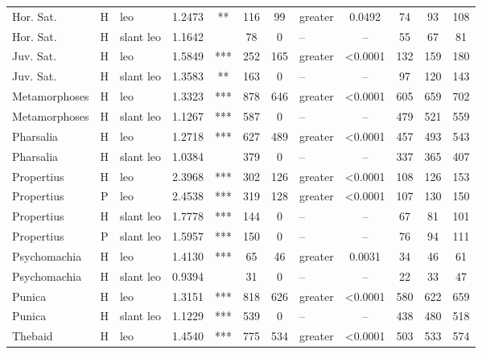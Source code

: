 \documentclass[twocolumn, switch]{article} %
\begin{document}
\begin{table}[h!]
\begin{tabular}{lclcccclcc@{\hspace{1\tabcolsep}}c@{\hspace{1\tabcolsep}}c}
     Hor. Sat. &     H &        leo & 1.2473 &    ** &  116 &        99 &     greater & 0.0492 &   74 &   93 &  108 \\
     Hor. Sat. &     H &  slant leo & 1.1642 &       &   78 &         0 &        -- & -- &   55 &   67 &   81 \\
     Juv. Sat. &     H &        leo & 1.5849 &   *** &  252 &       165 &     greater & <0.0001 &  132 &  159 &  180 \\
     Juv. Sat. &     H &  slant leo & 1.3583 &    ** &  163 &         0 &        -- & -- &   97 &  120 &  143 \\
 Metamorphoses &     H &        leo & 1.3323 &   *** &  878 &       646 &     greater & <0.0001 &  605 &  659 &  702 \\
 Metamorphoses &     H &  slant leo & 1.1267 &   *** &  587 &         0 &        -- & -- &  479 &  521 &  559 \\
     Pharsalia &     H &        leo & 1.2718 &   *** &  627 &       489 &     greater & <0.0001 &  457 &  493 &  543 \\
     Pharsalia &     H &  slant leo & 1.0384 &       &  379 &         0 &        -- & -- &  337 &  365 &  407 \\
    Propertius &     H &        leo & 2.3968 &   *** &  302 &       126 &     greater & <0.0001 &  108 &  126 &  153 \\
    Propertius &     P &        leo & 2.4538 &   *** &  319 &       128 &     greater & <0.0001 &  107 &  130 &  150 \\
    Propertius &     H &  slant leo & 1.7778 &   *** &  144 &         0 &        -- & -- &   67 &   81 &  101 \\
    Propertius &     P &  slant leo & 1.5957 &   *** &  150 &         0 &        -- & -- &   76 &   94 &  111 \\
  Psychomachia &     H &        leo & 1.4130 &   *** &   65 &        46 &     greater & 0.0031 &   34 &   46 &   61 \\
  Psychomachia &     H &  slant leo & 0.9394 &       &   31 &         0 &        -- & -- &   22 &   33 &   47 \\
        Punica &     H &        leo & 1.3151 &   *** &  818 &       626 &     greater & <0.0001 &  580 &  622 &  659 \\
        Punica &     H &  slant leo & 1.1229 &   *** &  539 &         0 &        -- & -- &  438 &  480 &  518 \\
       Thebaid &     H &        leo & 1.4540 &   *** &  775 &       534 &     greater & <0.0001 &  503 &  533 &  574 \\

\end{tabular}
\end{table}
\end{document}
